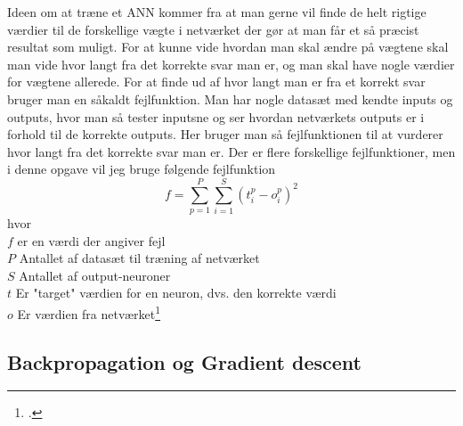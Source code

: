 Ideen om at træne et ANN kommer fra at man gerne vil finde de helt rigtige værdier til de forskellige vægte i netværket der gør at man får et så præcist resultat som muligt.
For at kunne vide hvordan man skal ændre på vægtene skal man vide hvor langt fra det korrekte svar man er, og man skal have nogle værdier for vægtene allerede.
For at finde ud af hvor langt man er fra et korrekt svar bruger man en såkaldt fejlfunktion. Man har nogle datasæt med kendte inputs og outputs, hvor man så tester
inputsne og ser hvordan netværkets outputs er i forhold til de korrekte outputs. Her bruger man så fejlfunktionen til at vurderer hvor langt fra det korrekte svar man er. Der er
flere forskellige fejlfunktioner, men i denne opgave vil jeg bruge følgende fejlfunktion
$$f=\sum_{p=1}^{P} \sum_{i=1}^{S}(t_i^p-o_i^p)^2$$
hvor\\
$f$ er en værdi der angiver fejl\\
$P$ Antallet af datasæt til træning af netværket\\
$S$ Antallet af output-neuroner\\
$t$ Er "target" værdien for en neuron, dvs. den korrekte værdi\\
$o$ Er værdien fra netværket\footcite{ANN11}

\subsection{Backpropagation og Gradient descent}

